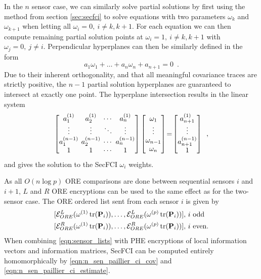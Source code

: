 In the $n$ sensor case, we can similarly solve partial solutions by first using the method from section \ref{sec:secfci} to solve equations with two parameters $\omega_k$ and $\omega_{k+1}$ when letting all $\omega_i=0,\ i\neq k,k+1$. For each equation we can then compute remaining partial solution points at $\omega_i=1,\ i\neq k,k+1$ with $\omega_j=0,\ j\neq i$. Perpendicular hyperplanes can then be similarly defined in the form 
\begin{equation}
   a_1\omega_1 + \dots +a_n\omega_n + a_{n+1} = 0\enspace. \label{eqn:nsen_plane_eq}
\end{equation}
Due to their inherent orthogonality, and that all meaningful covariance traces are strictly positive, the $n-1$ partial solution hyperplanes are guaranteed to intersect at exactly one point. The hyperplane intersection results in the linear system 
\begin{equation}
   \begingroup
   \setlength\arraycolsep{2pt}
   \begin{bmatrix}
      a_1^{(1)} & a_2^{(1)} & \cdots & a_{n}^{(1)} \\
      \vdots & \vdots & \ddots & \vdots \\
      a_1^{(n-1)} & a_2^{(n-1)} & \cdots & a_{n}^{(n-1)} \\
      1 & 1 & \cdots & 1
   \end{bmatrix}
   \begin{bmatrix}
      \omega_1 \\
      \vdots \\
      \omega_{n-1} \\
      \omega_{n}
   \end{bmatrix}
   \!=\!
   \begin{bmatrix}
      a_{n+1}^{(1)} \\
      \vdots \\
      a_{n+1}^{(n-1)} \\
      1
   \end{bmatrix}\enspace, \label{eqn:hyperplane_sol_eq}
   \endgroup
\end{equation}
and gives the solution to the SecFCI $\omega_i$ weights.

As all $O(n\log{p})$ ORE comparisons are done between sequential sensors $i$ and $i+1$, $L$ and $R$ ORE encryptions can be used to the same effect as for the two-sensor case. The ORE ordered list sent from each sensor $i$ is given by
\begin{equation}
   \begin{aligned} \label{eqn:sensor_lists}
      &[\mathcal{E}^L_{ORE}(\omega^{(1)}\operatorname{tr}({{\mathbf{P}}}_i)),\dots,\mathcal{E}^L_{ORE}(\omega^{(p)}\operatorname{tr}({{\mathbf{P}}}_i))],\,i\text{ odd} \\
      &[\mathcal{E}^R_{ORE}(\omega^{(1)}\operatorname{tr}({{\mathbf{P}}}_i)),\dots,\mathcal{E}^R_{ORE}(\omega^{(p)}\operatorname{tr}({{\mathbf{P}}}_i))],\,i\text{ even}.
   \end{aligned}
\end{equation}
When combining \eqref{eqn:sensor_lists} with PHE encryptions of local information vectors and information matrices, SecFCI can be computed entirely homomorphically by \eqref{eqn:n_sen_paillier_ci_cov} and \eqref{eqn:n_sen_paillier_ci_estimate}.

